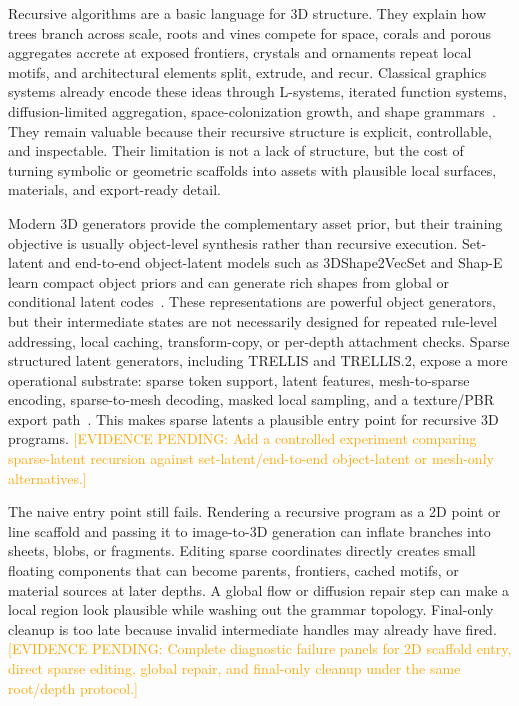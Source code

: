 \documentclass[sigconf,anonymous,review]{acmart}
\providecommand{\EvidencePending}[1]{\textcolor{orange}{[EVIDENCE PENDING: #1]}}
\begin{document}
Recursive algorithms are a basic language for 3D structure. They explain how trees branch across scale, roots and vines compete for space, corals and porous aggregates accrete at exposed frontiers, crystals and ornaments repeat local motifs, and architectural elements split, extrude, and recur. Classical graphics systems already encode these ideas through L-systems, iterated function systems, diffusion-limited aggregation, space-colonization growth, and shape grammars~\cite{lindenmayer1968lsystemsI,prusinkiewicz1990abop,barnsley1988fractalsEverywhere,witten1981dla,sander2000dlaReview,runions2007spacecolonization,stiny1972shapegrammars,mueller2006procedural}. They remain valuable because their recursive structure is explicit, controllable, and inspectable. Their limitation is not a lack of structure, but the cost of turning symbolic or geometric scaffolds into assets with plausible local surfaces, materials, and export-ready detail.

Modern 3D generators provide the complementary asset prior, but their training objective is usually object-level synthesis rather than recursive execution. Set-latent and end-to-end object-latent models such as 3DShape2VecSet and Shap-E learn compact object priors and can generate rich shapes from global or conditional latent codes~\cite{shape2vecset2023,shapE2023}. These representations are powerful object generators, but their intermediate states are not necessarily designed for repeated rule-level addressing, local caching, transform-copy, or per-depth attachment checks. Sparse structured latent generators, including TRELLIS and TRELLIS.2, expose a more operational substrate: sparse token support, latent features, mesh-to-sparse encoding, sparse-to-mesh decoding, masked local sampling, and a texture/PBR export path~\cite{trellis2024,trellis2project}. This makes sparse latents a plausible entry point for recursive 3D programs. \EvidencePending{Add a controlled experiment comparing sparse-latent recursion against set-latent/end-to-end object-latent or mesh-only alternatives.}

The naive entry point still fails. Rendering a recursive program as a 2D point or line scaffold and passing it to image-to-3D generation can inflate branches into sheets, blobs, or fragments. Editing sparse coordinates directly creates small floating components that can become parents, frontiers, cached motifs, or material sources at later depths. A global flow or diffusion repair step can make a local region look plausible while washing out the grammar topology. Final-only cleanup is too late because invalid intermediate handles may already have fired. \EvidencePending{Complete diagnostic failure panels for 2D scaffold entry, direct sparse editing, global repair, and final-only cleanup under the same root/depth protocol.}
\end{document}
